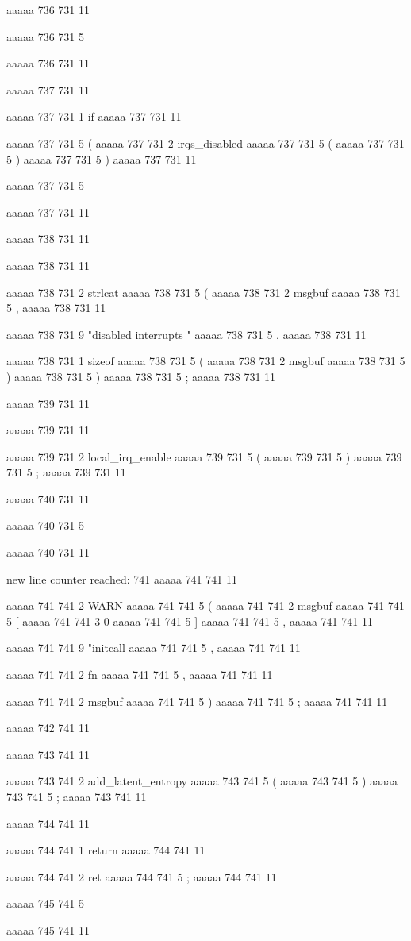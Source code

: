 {{aaaaa 736 731
11
	
aaaaa 736 731
5
}
aaaaa 736 731
11


aaaaa 737 731
11
	
aaaaa 737 731
1
if
aaaaa 737 731
11
 
aaaaa 737 731
5
(
aaaaa 737 731
2
irqs_disabled
aaaaa 737 731
5
(
aaaaa 737 731
5
)
aaaaa 737 731
5
)
aaaaa 737 731
11
 
aaaaa 737 731
5
{
aaaaa 737 731
11


aaaaa 738 731
11
	
aaaaa 738 731
11
	
aaaaa 738 731
2
strlcat
aaaaa 738 731
5
(
aaaaa 738 731
2
msgbuf
aaaaa 738 731
5
,
aaaaa 738 731
11
 
aaaaa 738 731
9
"disabled interrupts "
aaaaa 738 731
5
,
aaaaa 738 731
11
 
aaaaa 738 731
1
sizeof
aaaaa 738 731
5
(
aaaaa 738 731
2
msgbuf
aaaaa 738 731
5
)
aaaaa 738 731
5
)
aaaaa 738 731
5
;
aaaaa 738 731
11


aaaaa 739 731
11
	
aaaaa 739 731
11
	
aaaaa 739 731
2
local_irq_enable
aaaaa 739 731
5
(
aaaaa 739 731
5
)
aaaaa 739 731
5
;
aaaaa 739 731
11


aaaaa 740 731
11
	
aaaaa 740 731
5
}
aaaaa 740 731
11


new line counter reached: 741
aaaaa 741 741
11
	
aaaaa 741 741
2
WARN
aaaaa 741 741
5
(
aaaaa 741 741
2
msgbuf
aaaaa 741 741
5
[
aaaaa 741 741
3
0
aaaaa 741 741
5
]
aaaaa 741 741
5
,
aaaaa 741 741
11
 
aaaaa 741 741
9
"initcall %
aaaaa 741 741
5
,
aaaaa 741 741
11
 
aaaaa 741 741
2
fn
aaaaa 741 741
5
,
aaaaa 741 741
11
 
aaaaa 741 741
2
msgbuf
aaaaa 741 741
5
)
aaaaa 741 741
5
;
aaaaa 741 741
11


aaaaa 742 741
11


aaaaa 743 741
11
	
aaaaa 743 741
2
add_latent_entropy
aaaaa 743 741
5
(
aaaaa 743 741
5
)
aaaaa 743 741
5
;
aaaaa 743 741
11


aaaaa 744 741
11
	
aaaaa 744 741
1
return
aaaaa 744 741
11
 
aaaaa 744 741
2
ret
aaaaa 744 741
5
;
aaaaa 744 741
11


aaaaa 745 741
5
}
aaaaa 745 741
11


